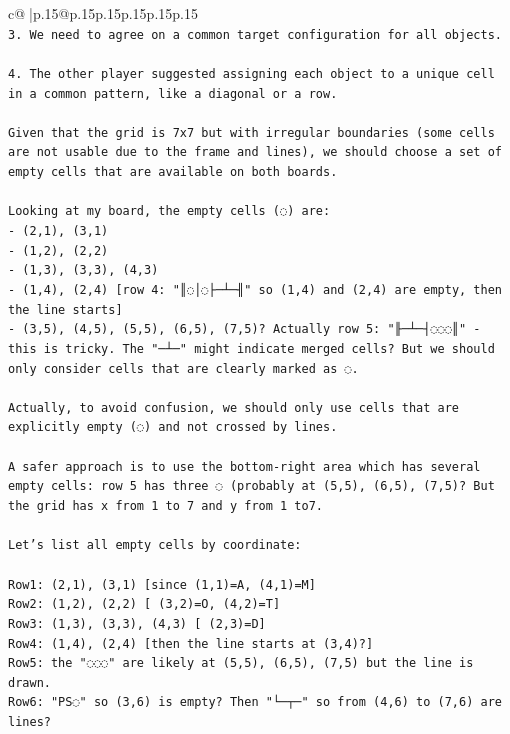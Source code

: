 \documentclass{article}
\begin{document}
{\begin{supertabular}{c@{$\;$}|p{.15\linewidth}@{}p{.15\linewidth}p{.15\linewidth}p{.15\linewidth}p{.15\linewidth}p{.15\linewidth}}
{{{\\ 
\texttt{3. We need to agree on a common target configuration for all objects.} \\
\\ 
\texttt{4. The other player suggested assigning each object to a unique cell in a common pattern, like a diagonal or a row.} \\
\\ 
\texttt{Given that the grid is 7x7 but with irregular boundaries (some cells are not usable due to the frame and lines), we should choose a set of empty cells that are available on both boards.} \\
\\ 
\texttt{Looking at my board, the empty cells (◌) are:} \\
\texttt{{-} (2,1), (3,1)} \\
\texttt{{-} (1,2), (2,2)} \\
\texttt{{-} (1,3), (3,3), (4,3)} \\
\texttt{{-} (1,4), (2,4) {[}row 4: "║◌│◌├─┴─╢" so (1,4) and (2,4) are empty, then the line starts{]}} \\
\texttt{{-} (3,5), (4,5), (5,5), (6,5), (7,5)? Actually row 5: "╟─┴─┤◌◌◌║" {-} this is tricky. The "─┴─" might indicate merged cells? But we should only consider cells that are clearly marked as ◌.} \\
\\ 
\texttt{Actually, to avoid confusion, we should only use cells that are explicitly empty (◌) and not crossed by lines.} \\
\\ 
\texttt{A safer approach is to use the bottom{-}right area which has several empty cells: row 5 has three ◌ (probably at (5,5), (6,5), (7,5)? But the grid has x from 1 to 7 and y from 1 to7.} \\
\\ 
\texttt{Let's list all empty cells by coordinate:} \\
\\ 
\texttt{Row1: (2,1), (3,1) {[}since (1,1)=A, (4,1)=M{]}} \\
\texttt{Row2: (1,2), (2,2) {[} (3,2)=O, (4,2)=T{]}} \\
\texttt{Row3: (1,3), (3,3), (4,3) {[} (2,3)=D{]}} \\
\texttt{Row4: (1,4), (2,4) {[}then the line starts at (3,4)?{]}} \\
\texttt{Row5: the "◌◌◌" are likely at (5,5), (6,5), (7,5) but the line is drawn.} \\
\texttt{Row6: "PS◌" so (3,6) is empty? Then "└─┬─" so from (4,6) to (7,6) are lines?} \\
}}}
\end{supertabular}}
\end{document}
